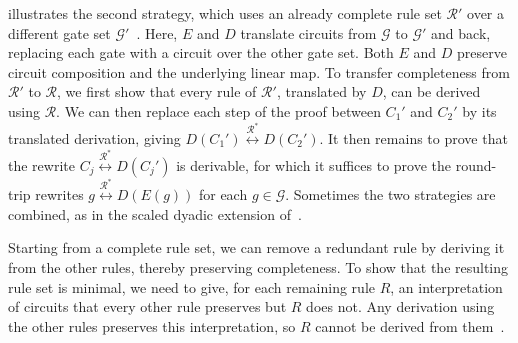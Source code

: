 \documentclass[acmsmall,nonacm,11pt,screen]{acmart}
\newcommand{\rewrites}[1]{\overset{#1^{*}}{\longleftrightarrow}}
\begin{document}
\vspace{-.2 cm}

 illustrates the second strategy, which uses an already complete rule set $\mathcal{R}'$ over a different gate set $\mathcal{G}'$~\cite{bian2023cliffordt2,bian2023cliffordcs3,clement2026realcliffordch,amy2024toffoli,blake2026simpler,clement2023complete,clement2024extensions,delorme2026control,schober2026control,blake2026qudit}. Here, $E$ and $D$ translate circuits from $\mathcal{G}$ to $\mathcal{G}'$ and back, replacing each gate with a circuit over the other gate set. Both $E$ and $D$ preserve circuit composition and the underlying linear map. To transfer completeness from $\mathcal{R}'$ to $\mathcal{R}$, we first show that every rule of $\mathcal{R}'$, translated by $D$, can be derived using $\mathcal{R}$. We can then replace each step of the proof between $C_1'$ and $C_2'$ by its translated derivation, giving $D(C_1')\rewrites{\mathcal{R}}D(C_2')$. 
It then remains to prove that the rewrite $C_j\rewrites{\mathcal{R}}D(C_j')$ is derivable, for which it suffices to prove the round-trip rewrites $g\rewrites{\mathcal{R}}D(E(g))$ for each $g\in\mathcal{G}$.
Sometimes the two strategies are combined, as in the scaled dyadic extension of~\cite{li2021on}.
 
Starting from a complete rule set, we can remove a redundant rule by deriving it from the other rules, thereby preserving completeness. To show that the resulting rule set is minimal, we need to give, for each remaining rule $R$, an interpretation of circuits that every other rule preserves but $R$ does not. Any derivation using the other rules preserves this interpretation, so $R$ cannot be derived from them~\cite{clement2024minimal,blake2026simpler}.
 
\end{document}
